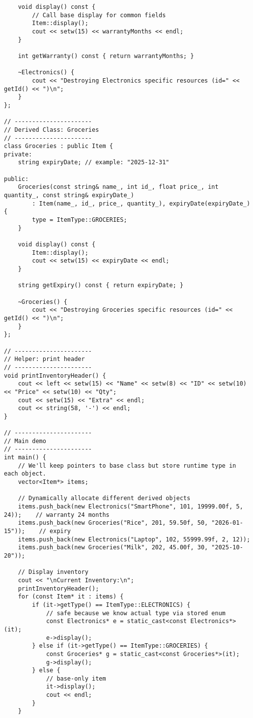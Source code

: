 \documentclass[12pt,a4paper]{article}
\begin{document}
\begin{lstlisting}
    void display() const {
        // Call base display for common fields
        Item::display();
        cout << setw(15) << warrantyMonths << endl;
    }

    int getWarranty() const { return warrantyMonths; }

    ~Electronics() {
        cout << "Destroying Electronics specific resources (id=" << getId() << ")\n";
    }
};

// ----------------------
// Derived Class: Groceries
// ----------------------
class Groceries : public Item {
private:
    string expiryDate; // example: "2025-12-31"

public:
    Groceries(const string& name_, int id_, float price_, int quantity_, const string& expiryDate_)
        : Item(name_, id_, price_, quantity_), expiryDate(expiryDate_) {
        type = ItemType::GROCERIES;
    }

    void display() const {
        Item::display();
        cout << setw(15) << expiryDate << endl;
    }

    string getExpiry() const { return expiryDate; }

    ~Groceries() {
        cout << "Destroying Groceries specific resources (id=" << getId() << ")\n";
    }
};

// ----------------------
// Helper: print header
// ----------------------
void printInventoryHeader() {
    cout << left << setw(15) << "Name" << setw(8) << "ID" << setw(10) << "Price" << setw(10) << "Qty";
    cout << setw(15) << "Extra" << endl;
    cout << string(58, '-') << endl;
}

// ----------------------
// Main demo
// ----------------------
int main() {
    // We'll keep pointers to base class but store runtime type in each object.
    vector<Item*> items;

    // Dynamically allocate different derived objects
    items.push_back(new Electronics("SmartPhone", 101, 19999.00f, 5, 24));    // warranty 24 months
    items.push_back(new Groceries("Rice", 201, 59.50f, 50, "2026-01-15"));    // expiry
    items.push_back(new Electronics("Laptop", 102, 55999.99f, 2, 12));
    items.push_back(new Groceries("Milk", 202, 45.00f, 30, "2025-10-20"));

    // Display inventory
    cout << "\nCurrent Inventory:\n";
    printInventoryHeader();
    for (const Item* it : items) {
        if (it->getType() == ItemType::ELECTRONICS) {
            // safe because we know actual type via stored enum
            const Electronics* e = static_cast<const Electronics*>(it);
            e->display();
        } else if (it->getType() == ItemType::GROCERIES) {
            const Groceries* g = static_cast<const Groceries*>(it);
            g->display();
        } else {
            // base-only item
            it->display();
            cout << endl;
        }
    }


\end{lstlisting}
\end{document}
